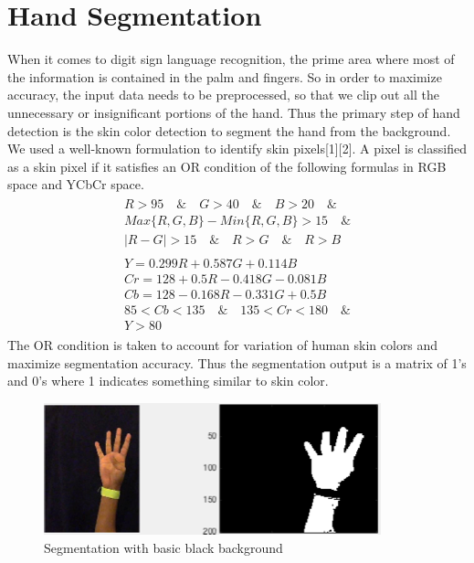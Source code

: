 \documentclass{acm} %
\begin{document}
\section{Hand Segmentation}
When it comes to digit sign language recognition,  the prime area where most of the information is contained in the palm and fingers. So in order to maximize accuracy, the input data needs to be preprocessed, so that we clip out all the unnecessary or insignificant portions of the hand. Thus the primary step of hand detection is the skin color detection to segment the hand from the background. We used a well-known formulation to identify skin pixels[1][2].  A pixel is classified as a skin pixel if it satisfies an OR condition of the following formulas in RGB space and YCbCr space.
\begin{multline}
\begin{align}
    R > 95\quad \&\quad G > 40\quad \&\quad B > 20 \quad \&\\
    Max\{R,G,B\} - Min\{R,G,B\} > 15\quad \& \\
    |R - G| > 15\quad \&\quad R > G\quad \&\quad R > B
\end{align}
\end{multline}
\begin{multline}
\begin{align}
    Y = 0.299R + 0.587G + 0.114B\\
    Cr = 128 + 0.5R - 0.418G - 0.081B\\
    Cb = 128 - 0.168R - 0.331G + 0.5B\\
    85 < Cb < 135\quad \&\quad 135 < Cr < 180\quad \&\\
    Y > 80
\end{align}
\end{multline}
The OR condition is taken to account for variation of human skin colors and maximize segmentation accuracy. Thus the segmentation output is a matrix of 1's and 0's where 1 indicates something similar to skin color.

\begin{figure}[h]
\centering
\includegraphics[width=3 in]{basic_black_background}
\caption{Segmentation with basic black background}
\label{fig:fig1}
\end{figure}
\end{document}
